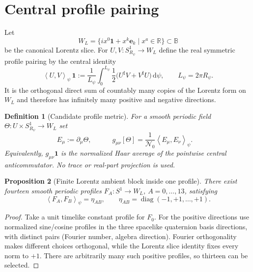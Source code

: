 \documentclass[11pt,a4paper]{article}
\newtheorem{definition}{Definition}[section]
\newtheorem{proposition}[definition]{Proposition}
\theoremstyle{remark}
\newcommand{\B}{\mathbb B}
\newcommand{\Nzero}{\mathcal N_0}
\newcommand{\avg}[1]{\left\langle #1\right\rangle_\psi}
\newcommand{\dd}{\mathrm d}
\newcommand{\one}{\mathbf 1}
\begin{document}
\section{Central profile pairing}

Let
\[
 W_L=\{ix^0\one+x^k\mathbf e_k\mid x^a\in\mathbb R\}\subset\B
\]
be the canonical Lorentz slice.  For $U,V:S^1_{R_\psi}\to W_L$ define the
real symmetric profile pairing by the central identity
\begin{equation}
 \avg{U,V}\,\one
 :=\frac1{L_\psi}\int_0^{L_\psi}
 \frac12\bigl(U^\sharp V+V^\sharp U\bigr)\,\dd\psi,
 \qquad L_\psi=2\pi R_\psi.
 \label{eq:profilepair}
\end{equation}
It is the orthogonal direct sum of countably many copies of the Lorentz form
on $W_L$ and therefore has infinitely many positive and negative directions.

\begin{definition}[Candidate profile metric]
For a smooth periodic field $\Theta:U\times S^1_{R_\psi}\to W_L$ set
\begin{equation}
 E_\mu:=\partial_\mu\Theta,
 \qquad
 \boxed{\quad g_{\mu\nu}[\Theta]
 =\frac1{\Nzero}\avg{E_\mu,E_\nu}.\quad}
 \label{eq:profilemetric}
\end{equation}
Equivalently, $g_{\mu\nu}\one$ is the normalized Haar average of the
pointwise central anticommutator.  No trace or real-part projection is used.
\end{definition}

\begin{proposition}[Finite Lorentz ambient block inside one profile]
There exist fourteen smooth periodic profiles $F_A:S^1\to W_L$,
$A=0,\ldots,13$, satisfying
\begin{equation}
 \avg{F_A,F_B}=\eta_{AB},
 \qquad \eta_{AB}=\operatorname{diag}(-1,+1,\ldots,+1).
 \label{eq:profilebasis}
\end{equation}
\end{proposition}

\begin{proof}
Take a unit timelike constant profile for $F_0$.  For the positive directions
use normalized sine/cosine profiles in the three spacelike quaternion
basis directions, with distinct pairs (Fourier number, algebra direction).
Fourier orthogonality makes different choices orthogonal, while the Lorentz
slice identity fixes every norm to $+1$.  There are arbitrarily many such
positive profiles, so thirteen can be selected.
\end{proof}
\end{document}
